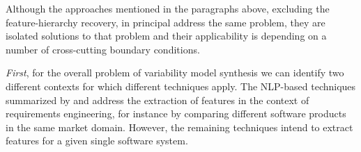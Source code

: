   

Although the approaches mentioned in the paragraphs above, excluding the
feature-hierarchy recovery, in principal address the same problem, they are
isolated solutions to that problem and their applicability  is depending on a
number of cross-cutting boundary conditions.

\emph{First}, for the overall problem of variability model synthesis we can
identify two different contexts for which different techniques apply. The NLP-based
techniques summarized by \cite{alves_exploratory_2008} and \cite{bakar_feature_2015} address
the extraction of features in the context of requirements engineering, for instance by comparing different
software products in the same market domain. However, the remaining techniques
intend to extract features for a given single software system.

